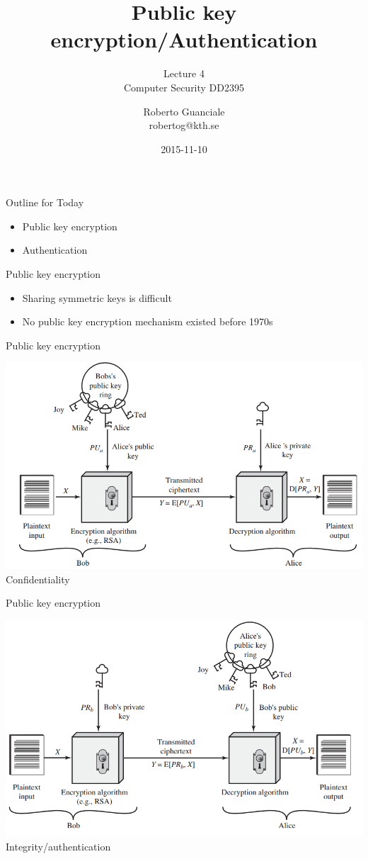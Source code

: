 \documentclass{beamer}
\title{Public key encryption/Authentication}
\subtitle{Lecture 4 \\ Computer Security DD2395}
\author[R. Guanciale]{
  Roberto Guanciale\\
  robertog@kth.se
}
\date{2015-11-10}
\begin{document}
\begin{frame}[plain]
  \titlepage
\end{frame}

\begin{frame}{Outline for Today}
  \begin{itemize}
    \item Public key encryption
    \item Authentication
  \end{itemize}
\end{frame}

\begin{frame}{Public key encryption}
  \begin{itemize}
    \item Sharing symmetric keys is difficult
    \item No public key  encryption mechanism existed before 1970s
  \end{itemize}
\end{frame}

\begin{frame}{Public key encryption}
  \begin{center}
    \includegraphics[width=0.8\linewidth]{public1}\\
    Confidentiality
  \end{center}
\end{frame}

\begin{frame}{Public key encryption}
  \begin{center}
    \includegraphics[width=0.8\linewidth]{public2}\\
  Integrity/authentication
  \end{center}
\end{frame}
\end{document}
